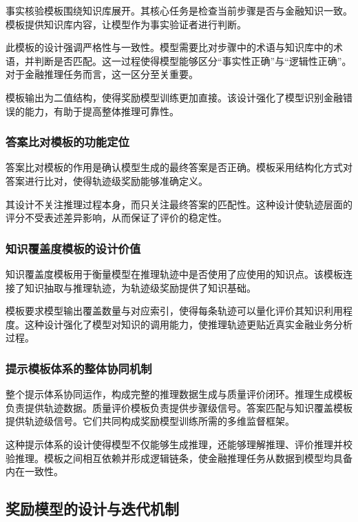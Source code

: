 \documentclass[professional,privacy,print,win,long,STEM,AutoFakeBold]{def/buaa}
\begin{document}
事实核验模板围绕知识库展开。其核心任务是检查当前步骤是否与金融知识一致。模板提供知识库内容，让模型作为事实验证者进行判断。

此模板的设计强调严格性与一致性。模型需要比对步骤中的术语与知识库中的术语，并判断是否匹配。这一过程使得模型能够区分“事实性正确”与“逻辑性正确”。对于金融推理任务而言，这一区分至关重要。

模板输出为二值结构，使得奖励模型训练更加直接。该设计强化了模型识别金融错误的能力，有助于提高整体推理可靠性。

\subsubsection{答案比对模板的功能定位}

答案比对模板的作用是确认模型生成的最终答案是否正确。模板采用结构化方式对答案进行比对，使得轨迹级奖励能够准确定义。

其设计不关注推理过程本身，而只关注最终答案的匹配性。这种设计使轨迹层面的评分不受表述差异影响，从而保证了评价的稳定性。

\subsubsection{知识覆盖度模板的设计价值}

知识覆盖度模板用于衡量模型在推理轨迹中是否使用了应使用的知识点。该模板连接了知识抽取与推理轨迹，为轨迹级奖励提供了知识基础。

模板要求模型输出覆盖数量与对应索引，使得每条轨迹可以量化评价其知识利用程度。这种设计强化了模型对知识的调用能力，使推理轨迹更贴近真实金融业务分析过程。

\subsubsection{提示模板体系的整体协同机制}

整个提示体系协同运作，构成完整的推理数据生成与质量评价闭环。推理生成模板负责提供轨迹数据。质量评价模板负责提供步骤级信号。答案匹配与知识覆盖模板提供轨迹级信号。它们共同构成奖励模型训练所需的多维监督框架。

这种提示体系的设计使得模型不仅能够生成推理，还能够理解推理、评价推理并校验推理。模板之间相互依赖并形成逻辑链条，使金融推理任务从数据到模型均具备内在一致性。


\subsection{奖励模型的设计与迭代机制}
\end{document}
